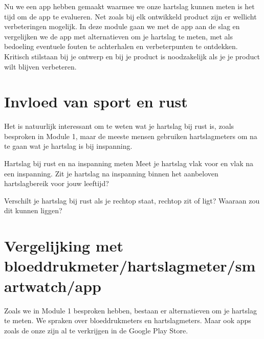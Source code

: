 
\begin{samenvatting}
	Nu we een app hebben gemaakt waarmee we onze hartslag kunnen meten is het tijd om de app te evalueren. Net zoals bij elk ontwikkeld product zijn er wellicht verbeteringen mogelijk. In deze module gaan we met de app aan de slag en vergelijken we de app met alternatieven om je hartslag te meten, met als bedoeling eventuele fouten te achterhalen en verbeterpunten te ontdekken. Kritisch stilstaan bij je ontwerp en bij je product is noodzakelijk als je je product wilt blijven verbeteren.
\end{samenvatting}
%

\section{Invloed van sport en rust}
\label{sec:Mod6_Sec2}
%

Het is natuurlijk interessant om te weten wat je hartslag bij rust is, zoals besproken in Module 1, maar de meeste mensen gebruiken hartslagmeters om na te gaan wat je hartslag is bij inspanning.

\begin{opdracht}{Hartslag bij rust en na inspanning meten}
Meet je hartslag vlak voor en vlak na een inspanning. Zit je hartslag na inspanning binnen het aanbeloven hartslagbereik voor jouw leeftijd?

Verschilt je hartslag bij rust als je rechtop staat, rechtop zit of ligt? Waaraan zou dit kunnen liggen?
\end{opdracht}

\section{Vergelijking met bloeddrukmeter/hartslagmeter/smartwatch/app}
\label{sec:Mod6_Sec1}
%
Zoals we in Module 1 besproken hebben, bestaan er alternatieven om je hartslag te meten. We spraken over bloeddrukmeters en hartslagmeters. Maar ook apps zoals de onze zijn al te verkrijgen in de Google Play Store.

